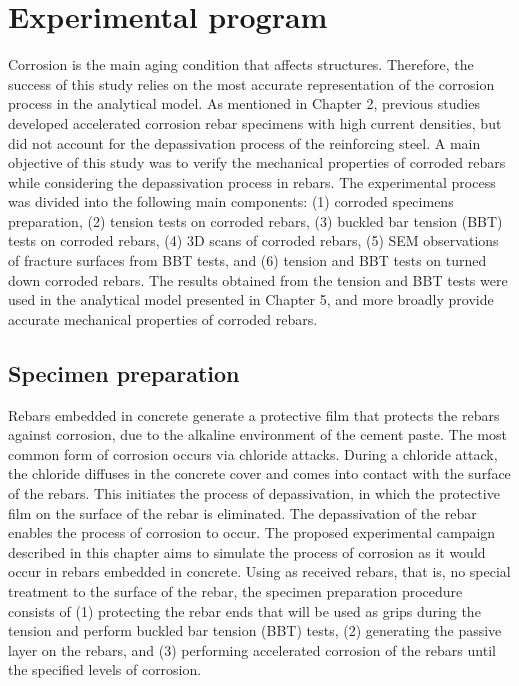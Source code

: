 \chapter{Experimental program}
\label{chap-three}

Corrosion is the main aging condition that affects structures. Therefore, the success of this study relies on the most accurate representation of the corrosion process in the analytical model. As mentioned in Chapter 2, previous studies developed accelerated corrosion rebar specimens with high current densities, but did not account for the depassivation process of the reinforcing steel. A main objective of this study was to verify the mechanical properties of corroded rebars while considering the depassivation process in rebars. The experimental process was divided into the following main components: (1) corroded specimens preparation, (2) tension tests on corroded rebars, (3) buckled bar tension (BBT) tests on corroded rebars, (4) 3D scans of corroded rebars, (5) SEM observations of fracture surfaces from BBT tests, and (6) tension and BBT   tests on turned down corroded rebars. The results obtained from the tension  and BBT  tests  were used in the analytical model presented in Chapter 5, and more broadly provide accurate mechanical properties of corroded rebars.

\section{Specimen preparation}

Rebars embedded in concrete generate a protective film that protects the rebars against corrosion, due to the alkaline environment of the cement paste. The most common form of corrosion occurs via chloride attacks. During a chloride attack, the chloride diffuses in the concrete cover and comes into contact with the surface of the rebars. This initiates the process of depassivation,    in which the protective film on the surface of the rebar is eliminated. The depassivation of the rebar enables the process of corrosion to occur. The proposed experimental campaign described in this chapter aims to simulate the process of corrosion as it would occur in rebars embedded   in concrete. Using as received rebars, that is, no special treatment to the surface of the rebar, the specimen preparation procedure consists of (1) protecting the rebar ends that will be used as  grips during the tension and perform buckled bar tension (BBT) tests, (2) generating the passive layer on the rebars, and (3) performing accelerated corrosion of the rebars until the specified levels of corrosion.

